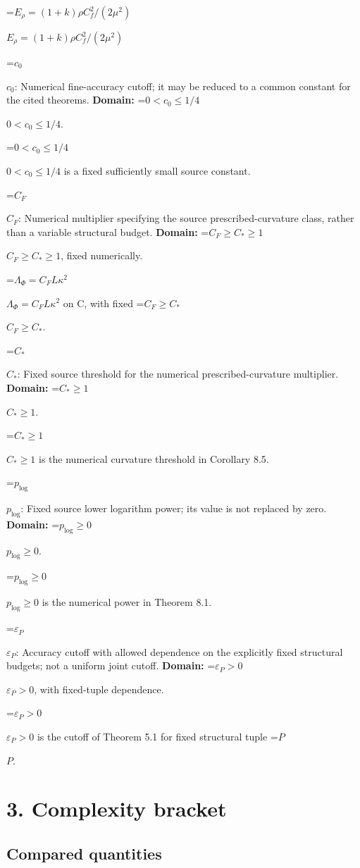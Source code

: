 \documentclass[10pt,a4paper]{article}
\newcommand{\AtlasMath}[1]{\par\begingroup\centering\setbox0=\hbox{$\displaystyle #1$}\ifdim\wd0>1.4\linewidth\typeout{ATLAS WIDE FORMULA: \the\wd0}\fi\ifdim\wd0>\linewidth\resizebox{\linewidth}{!}{\box0}\else\box0\fi\par\endgroup}
\newcommand{\AtlasInlineMath}[1]{\begingroup\setbox0=\hbox{$#1$}\ifdim\wd0>.4\linewidth\endgroup\AtlasMath{#1}\else\endgroup$#1$\fi}
\begin{document}
\AtlasInlineMath{E_\rho=(1+k)\rho C_f^2/(2\mu^2)}



\AtlasInlineMath{c_0}: Numerical fine-accuracy cutoff; it may be reduced to a common constant for the cited theorems. \textbf{Domain:} \AtlasInlineMath{0<c_0\le1/4}.



\AtlasInlineMath{0<c_0\le1/4} is a fixed sufficiently small source constant.



\AtlasInlineMath{C_F}: Numerical multiplier specifying the source prescribed-curvature class, rather than a variable structural budget. \textbf{Domain:} \AtlasInlineMath{C_F\ge C_*\ge1}, fixed numerically.



\AtlasInlineMath{\Lambda_\Phi=C_F L\kappa^2} on C, with fixed \AtlasInlineMath{C_F\ge C_*}.



\AtlasInlineMath{C_*}: Fixed source threshold for the numerical prescribed-curvature multiplier. \textbf{Domain:} \AtlasInlineMath{C_*\ge1}.



\AtlasInlineMath{C_*\ge1} is the numerical curvature threshold in Corollary 8.5.



\AtlasInlineMath{p_{\log}}: Fixed source lower logarithm power; its value is not replaced by zero. \textbf{Domain:} \AtlasInlineMath{p_{\log}\ge0}.



\AtlasInlineMath{p_{\log}\ge0} is the numerical power in Theorem 8.1.



\AtlasInlineMath{\varepsilon_P}: Accuracy cutoff with allowed dependence on the explicitly fixed structural budgets; not a uniform joint cutoff. \textbf{Domain:} \AtlasInlineMath{\varepsilon_P>0}, with fixed-tuple dependence.



\AtlasInlineMath{\varepsilon_P>0} is the cutoff of Theorem 5.1 for fixed structural tuple \AtlasInlineMath{P}.



\section{3. Complexity bracket}


\subsection{Compared quantities}
\end{document}
